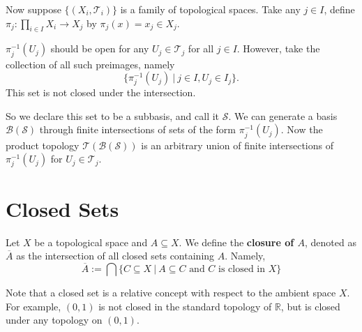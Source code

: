 \documentclass[article,11pt, reqno]{article}
\theoremstyle{remark}
\newcommand{\tb}{\textbf}
\newcommand{\mb}{\mathbb}
\newcommand{\mc}{\mathcal}
\newcommand{\<}{\langle}
\renewcommand{\>}{\rangle}
\begin{document}
Now suppose $\{(X_i, \mc T_i)\}$ is a family of topological spaces. Take any $j\in I$, define $\pi_j:\prod_{i\in I} X_i\rightarrow X_j$ by $\pi_j(x)=x_j\in X_j$.

$\pi_j^{-1}(U_j)$ should be open for any $U_j\in\mc T_j$ for all $j\in I$. However, take the collection of all such preimages, namely
$$\{\pi^{-1}_j(U_j)\ | \ j\in I, U_j\in I_j\}.$$
This set is not closed under the intersection.

So we declare this set to be a subbasis, and call it $\mc S$. We can generate a basis $\mc B(\mc S)$ through finite intersections of sets of the form $\pi^{-1}_j(U_j)$. Now the product topology $\mc T(\mc B(\mc S))$ is an arbitrary union of finite intersections of $\pi^{-1}_j(U_j)$ for $U_j\in \mc T_j$.

\section{Closed Sets}
Let $X$ be a topological space and $A\subseteq X$. We define the \tb{closure of $A$}, denoted as $\overline{A}$ as the intersection of all closed sets containing $A$. Namely,
$$\overline{A} := \bigcap\{C\subseteq X\ | \ A\subseteq C \text{ and } C \text{ is closed in } X\}$$

Note that a closed set is a relative concept with respect to the ambient space $X$. For example, $(0,1)$ is not closed in the standard topology of $\mb R$, but is closed under any topology on $(0,1)$.
\end{document}
